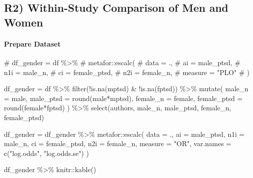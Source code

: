 \documentclass[
  letterpaper,
  DIV=11,
  numbers=noendperiod]{scrartcl}
\let\oldparagraph\paragraph
\renewcommand{\paragraph}[1]{\oldparagraph{#1}\mbox{}}
\newenvironment{Shaded}{\begin{snugshade}}{\end{snugshade}}
\newcommand{\AttributeTok}[1]{\textcolor[rgb]{0.40,0.45,0.13}{#1}}
\newcommand{\CommentTok}[1]{\textcolor[rgb]{0.37,0.37,0.37}{#1}}
\newcommand{\FunctionTok}[1]{\textcolor[rgb]{0.28,0.35,0.67}{#1}}
\newcommand{\NormalTok}[1]{\textcolor[rgb]{0.00,0.23,0.31}{#1}}
\newcommand{\OtherTok}[1]{\textcolor[rgb]{0.00,0.23,0.31}{#1}}
\newcommand{\SpecialCharTok}[1]{\textcolor[rgb]{0.37,0.37,0.37}{#1}}
\newcommand{\StringTok}[1]{\textcolor[rgb]{0.13,0.47,0.30}{#1}}
\begin{document}
\subsection{R2) Within-Study Comparison of Men and
Women}\label{r2-within-study-comparison-of-men-and-women}

\paragraph{Prepare Dataset}\label{prepare-dataset}

\begin{Shaded}
\begin{Highlighting}[]
\CommentTok{\# df\_gender = df \%\textgreater{}\%}
\CommentTok{\#   metafor::escalc(}
\CommentTok{\#     data = .,}
\CommentTok{\#     ai = \textasciigrave{}male\_ptsd\textasciigrave{},}
\CommentTok{\#     n1i = \textasciigrave{}male\_n\textasciigrave{},}
\CommentTok{\#     ci = \textasciigrave{}female\_ptsd\textasciigrave{},}
\CommentTok{\#     n2i = \textasciigrave{}female\_n\textasciigrave{},}
\CommentTok{\#     measure = "PLO"}
\CommentTok{\# )}

\NormalTok{df\_gender }\OtherTok{=}\NormalTok{ df }\SpecialCharTok{\%\textgreater{}\%}
  \FunctionTok{filter}\NormalTok{(}\SpecialCharTok{!}\FunctionTok{is.na}\NormalTok{(mptsd) }\SpecialCharTok{\&} \SpecialCharTok{!}\FunctionTok{is.na}\NormalTok{(fptsd)) }\SpecialCharTok{\%\textgreater{}\%}
  \FunctionTok{mutate}\NormalTok{(}
    \AttributeTok{male\_n =}\NormalTok{ male,}
    \AttributeTok{male\_ptsd =} \FunctionTok{round}\NormalTok{(male}\SpecialCharTok{*}\NormalTok{mptsd),}
    \AttributeTok{female\_n =}\NormalTok{ female,}
    \AttributeTok{female\_ptsd =} \FunctionTok{round}\NormalTok{(female}\SpecialCharTok{*}\NormalTok{fptsd)}
\NormalTok{  ) }\SpecialCharTok{\%\textgreater{}\%}
  \FunctionTok{select}\NormalTok{(authors, male\_n, male\_ptsd, female\_n, female\_ptsd)}

\NormalTok{df\_gender }\OtherTok{=}\NormalTok{ df\_gender }\SpecialCharTok{\%\textgreater{}\%}
\NormalTok{  metafor}\SpecialCharTok{::}\FunctionTok{escalc}\NormalTok{(}
    \AttributeTok{data =}\NormalTok{ .,}
    \AttributeTok{ai =} \StringTok{\textasciigrave{}}\AttributeTok{male\_ptsd}\StringTok{\textasciigrave{}}\NormalTok{, }
    \AttributeTok{n1i =} \StringTok{\textasciigrave{}}\AttributeTok{male\_n}\StringTok{\textasciigrave{}}\NormalTok{,}
    \AttributeTok{ci =} \StringTok{\textasciigrave{}}\AttributeTok{female\_ptsd}\StringTok{\textasciigrave{}}\NormalTok{,}
    \AttributeTok{n2i =} \StringTok{\textasciigrave{}}\AttributeTok{female\_n}\StringTok{\textasciigrave{}}\NormalTok{,}
    \AttributeTok{measure =} \StringTok{"OR"}\NormalTok{,}
    \AttributeTok{var.names =} \FunctionTok{c}\NormalTok{(}\StringTok{"log.odds"}\NormalTok{, }\StringTok{"log.odds.se"}\NormalTok{)}
\NormalTok{  )}


\NormalTok{df\_gender }\SpecialCharTok{\%\textgreater{}\%}
\NormalTok{   knitr}\SpecialCharTok{::}\FunctionTok{kable}\NormalTok{()}
\end{Highlighting}
\end{Shaded}
\end{document}
